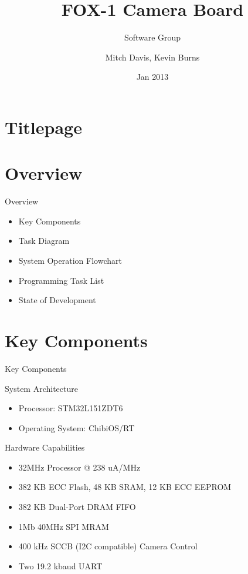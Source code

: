 \documentclass{beamer}
\author{Mitch Davis, Kevin Burns}
\title{FOX-1 Camera Board}
\subtitle{Software Group}
\institute{Virginia Tech}
\date{Jan 2013}
\begin{document}
\section{Titlepage}
\begin{frame}
\titlepage
\end{frame}

\section{Overview}
\begin{frame}{Overview}
	\begin{itemize}
		\item Key Components
		\item Task Diagram
		\item System Operation Flowchart
		\item Programming Task List
		\item State of Development
	\end{itemize}
\end{frame}

\section{Key Components}
\begin{frame}{Key Components}
	\begin{block}{System Architecture}
		\begin{itemize}
			\item Processor: STM32L151ZDT6
			\item Operating System: ChibiOS/RT
		\end{itemize}
	\end{block}
	\begin{block}{Hardware Capabilities}
		\begin{itemize}
			\item 32MHz Processor @ 238 uA/MHz
			\item 382 KB ECC Flash, 48 KB SRAM, 12 KB ECC EEPROM
			\item 382 KB Dual-Port DRAM FIFO
			\item 1Mb 40MHz SPI MRAM
			\item 400 kHz SCCB (I2C compatible) Camera Control
			\item Two 19.2 kbaud UART
		\end{itemize}
	\end{block}
\end{frame}
\end{document}
